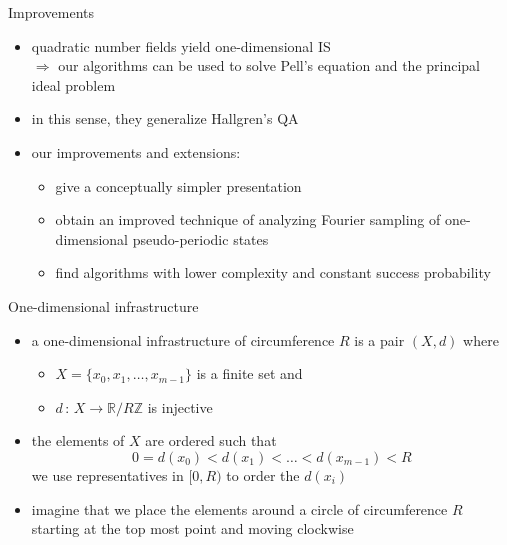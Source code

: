 \documentclass[slideColor]{prosper}
\renewcommand{\R}{\mathbb{R}}
\newcommand{\Z}{\mathbb{Z}}
\renewcommand{\>}{\rangle}
\newcommand{\<}{\langle}
\begin{document}

\begin{slide}{Improvements}
\vspace{-0.4cm}
\begin{itemize}
\item quadratic number fields yield one-dimensional IS\\ $\Rightarrow$ 
our algorithms can be used to solve Pell's equation and the principal ideal problem

\medskip
\item in this sense, they generalize Hallgren's QA

\medskip
\item our improvements and extensions:

\medskip
\begin{itemize}
\item give a conceptually simpler presentation 

\medskip
\item obtain an improved technique of analyzing Fourier sampling of one-dimensional pseudo-periodic states

\medskip
\item find algorithms with lower complexity and constant success probability
\end{itemize}
\end{itemize}
\end{slide}


\begin{slide}{One-dimensional infrastructure}

\begin{itemize}
\item a one-dimensional infrastructure of circumference $R$ is a pair $(X,d)$ where

\begin{itemize}
\item $X=\{x_0,x_1,\ldots,x_{m-1}\}$ is a finite set and

\medskip
\item $d \, : \, X \rightarrow \R/R\Z$ is injective
\end{itemize}

\medskip
\item the elements of $X$ are ordered such that 
\[
0=d(x_0)<d(x_1)<\ldots<d(x_{m-1})<R
\]
we use representatives in $[0,R)$ to order the $d(x_i)$

\medskip
\item imagine that we place the elements around a circle of circumference $R$ starting at the top most point and moving clockwise
\end{itemize}

\end{slide}
\end{document}
